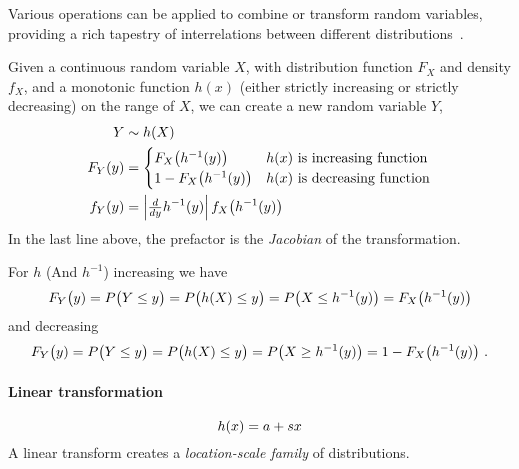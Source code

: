 

\clearpage
{}

Various operations can be applied to combine or transform random variables, providing a rich tapestry of interrelations between different distributions~\cite{Springer1979a, Devroye1986}.


\label{transforms}


Given a continuous random variable $X$, with distribution function $F_X$ and density $f_X$, and a monotonic function $h(x)$ (either strictly increasing or strictly decreasing) on the range of $X$, we can create a new random variable $Y$, 
\begin{align*}
Y &\sim h(X)  \\
F_Y(y) &= \begin{cases}
	F_X\bigl( h^{-1}(y) \bigr) & \text{$h(x)$ is increasing function}  \\ 
	1- F_X\bigl( h^{-1}(y) \bigr) &  \text{$h(x)$ is decreasing function} 
	\end{cases}
	\\
f_Y(y) &= \left|\tfrac{d}{dy}h^{-1}(y)\right| f_X\bigl( h^{-1}(y) \bigr) 
\end{align*}
In the last line above, the prefactor is the {\em Jacobian} of the transformation. 

For $h$ (And $h^{-1}$) increasing we have
\[
F_Y\bigl(y) = P\bigl(Y\leq y\bigr) = P\bigl(h(X) \leq y\bigr) = P\bigl(X \leq h^{-1}(y) \bigr) =
 F_X\bigl( h^{-1}(y) \bigr) 
\notag
\]
and decreasing
\[
F_Y\bigl(y) = P\bigl(Y\leq y\bigr) = P\bigl(h(X) \leq y\bigr) = P\bigl(X \geq h^{-1}(y) \bigr) =
 1- F_X\bigl( h^{-1}(y) \bigr) 
\notag \ .
\]


\paragraph*{Linear transformation}
\[
h(x) = a+ s x 
\notag
\]
A linear transform creates a {\sl location-scale family} of distributions. 



